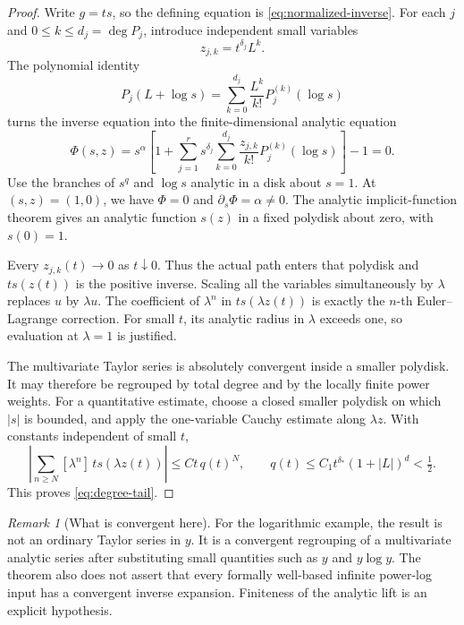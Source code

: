 \documentclass[11pt,a4paper]{article}
\numberwithin{equation}{section}
\theoremstyle{definition}\newtheorem{definition}[theorem]{Definition}
\theoremstyle{remark}\newtheorem{remark}[theorem]{Remark}
\begin{document}
\begin{proof}
Write \(g=t s\), so the defining equation is \eqref{eq:normalized-inverse}.
For each \(j\) and \(0\le k\le d_j=\deg P_j\), introduce independent small
variables
\[
 z_{j,k}=t^{\delta_j}L^k.
\]
The polynomial identity
\[
 P_j(L+\log s)=\sum_{k=0}^{d_j}\frac{L^k}{k!}P_j^{(k)}(\log s)
\]
turns the inverse equation into the finite-dimensional analytic equation
\begin{equation}\label{eq:analytic-lift}
 \Phi(s,z)=s^\alpha\left[
 1+\sum_{j=1}^r s^{\delta_j}
      \sum_{k=0}^{d_j}\frac{z_{j,k}}{k!}P_j^{(k)}(\log s)
 \right]-1=0.
\end{equation}
Use the branches of \(s^q\) and \(\log s\) analytic in a disk about \(s=1\).
At \((s,z)=(1,0)\), we have \(\Phi=0\) and \(\partial_s\Phi=\alpha\ne0\).
The analytic implicit-function theorem gives an analytic function \(s(z)\)
in a fixed polydisk about zero, with \(s(0)=1\).

Every \(z_{j,k}(t)\to0\) as \(t\downarrow0\). Thus the actual path enters
that polydisk and \(t s(z(t))\) is the positive inverse. Scaling all the
variables simultaneously by \(\lambda\) replaces \(u\) by \(\lambda u\).
The coefficient of \(\lambda^n\) in \(t s(\lambda z(t))\) is exactly the
\(n\)-th Euler--Lagrange correction. For small \(t\), its analytic radius in
\(\lambda\) exceeds one, so evaluation at \(\lambda=1\) is justified.

The multivariate Taylor series is absolutely convergent inside a smaller
polydisk. It may therefore be regrouped by total degree and by the locally
finite power weights. For a quantitative estimate, choose a closed smaller
polydisk on which \(|s|\) is bounded, and apply the one-variable Cauchy
estimate along \(\lambda z\). With constants independent of small \(t\),
\[
 \left|\sum_{n\ge N}[\lambda^n]\,t s(\lambda z(t))\right|
 \le C t\,q(t)^N,
 \qquad
 q(t)\le C_1 t^{\delta_*}(1+|L|)^d<\tfrac12.
\]
This proves \eqref{eq:degree-tail}.
\end{proof}

\begin{remark}[What is convergent here]
For the logarithmic example, the result is not an ordinary Taylor series in
\(y\). It is a convergent regrouping of a multivariate analytic series after
substituting small quantities such as \(y\) and \(y\log y\). The theorem
also does not assert that every formally well-based infinite power-log input
has a convergent inverse expansion. Finiteness of the analytic lift is an
explicit hypothesis.
\end{remark}
\end{document}
